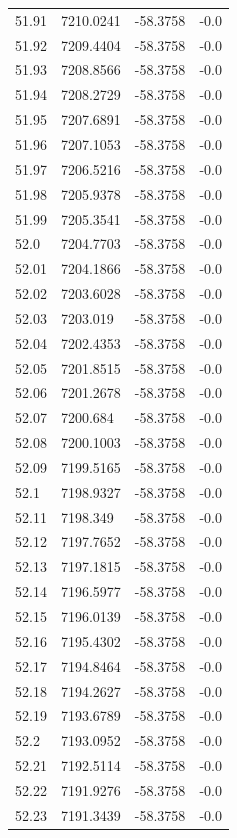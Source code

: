 \begin{table}[H]
\begin{tabular}{llll}
51.91 & 7210.0241 & -58.3758 & -0.0 \\
51.92 & 7209.4404 & -58.3758 & -0.0 \\
51.93 & 7208.8566 & -58.3758 & -0.0 \\
51.94 & 7208.2729 & -58.3758 & -0.0 \\
51.95 & 7207.6891 & -58.3758 & -0.0 \\
51.96 & 7207.1053 & -58.3758 & -0.0 \\
51.97 & 7206.5216 & -58.3758 & -0.0 \\
51.98 & 7205.9378 & -58.3758 & -0.0 \\
51.99 & 7205.3541 & -58.3758 & -0.0 \\
52.0 & 7204.7703 & -58.3758 & -0.0 \\
52.01 & 7204.1866 & -58.3758 & -0.0 \\
52.02 & 7203.6028 & -58.3758 & -0.0 \\
52.03 & 7203.019 & -58.3758 & -0.0 \\
52.04 & 7202.4353 & -58.3758 & -0.0 \\
52.05 & 7201.8515 & -58.3758 & -0.0 \\
52.06 & 7201.2678 & -58.3758 & -0.0 \\
52.07 & 7200.684 & -58.3758 & -0.0 \\
52.08 & 7200.1003 & -58.3758 & -0.0 \\
52.09 & 7199.5165 & -58.3758 & -0.0 \\
52.1 & 7198.9327 & -58.3758 & -0.0 \\
52.11 & 7198.349 & -58.3758 & -0.0 \\
52.12 & 7197.7652 & -58.3758 & -0.0 \\
52.13 & 7197.1815 & -58.3758 & -0.0 \\
52.14 & 7196.5977 & -58.3758 & -0.0 \\
52.15 & 7196.0139 & -58.3758 & -0.0 \\
52.16 & 7195.4302 & -58.3758 & -0.0 \\
52.17 & 7194.8464 & -58.3758 & -0.0 \\
52.18 & 7194.2627 & -58.3758 & -0.0 \\
52.19 & 7193.6789 & -58.3758 & -0.0 \\
52.2 & 7193.0952 & -58.3758 & -0.0 \\
52.21 & 7192.5114 & -58.3758 & -0.0 \\
52.22 & 7191.9276 & -58.3758 & -0.0 \\
52.23 & 7191.3439 & -58.3758 & -0.0 \\

\end{tabular}
\end{table}
